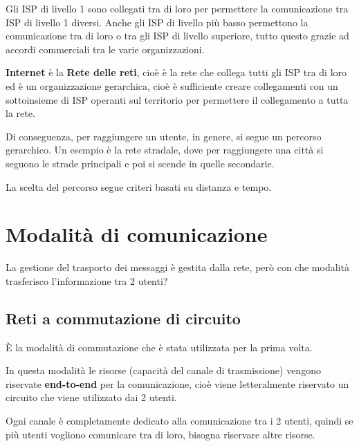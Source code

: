 \documentclass[a4paper]{article}
\begin{document}
\noindent
Gli ISP di livello 1 sono collegati tra di loro per permettere la comunicazione
tra ISP di livello 1 diversi. Anche gli ISP di livello più basso permettono
la comunicazione tra di loro o tra gli ISP di livello superiore, tutto questo
grazie ad accordi commerciali tra le varie organizzazioni.
\label{09-10-D3}

\noindent
\textbf{Internet} è la \textbf{Rete delle reti}, cioè è la rete che collega
tutti gli ISP tra di loro ed è un organizzazione gerarchica, cioè è sufficiente
creare collegamenti con un sottoinsieme di ISP operanti sul territorio per permettere
il collegamento a tutta la rete.

\noindent
Di conseguenza, per raggiungere un utente, in genere, si segue un percorso gerarchico.
Un esempio è la rete stradale, dove per raggiungere una città si seguono le strade
principali e poi si scende in quelle secondarie.
\label{09-10-D4}

\noindent
La scelta del percorso segue criteri basati su distanza e tempo.

\section{Modalità di comunicazione}
La gestione del trasporto dei messaggi è gestita dalla rete, però con che modalità
trasferisco l'informazione tra 2 utenti?

\subsection{Reti a commutazione di circuito}
È la modalità di commutazione che è stata utilizzata per la prima volta.

\noindent
In questa modalità le risorse (capacità del canale di trasmissione) vengono riservate \textbf{end-to-end}
per la comunicazione, cioè viene letteralmente riservato un circuito che viene
utilizzato dai 2 utenti.
\label{09-10-D5}

\noindent
Ogni canale è completamente dedicato alla comunicazione tra i 2 utenti, quindi
se più utenti vogliono comunicare tra di loro, bisogna riservare altre risorse.
\end{document}
